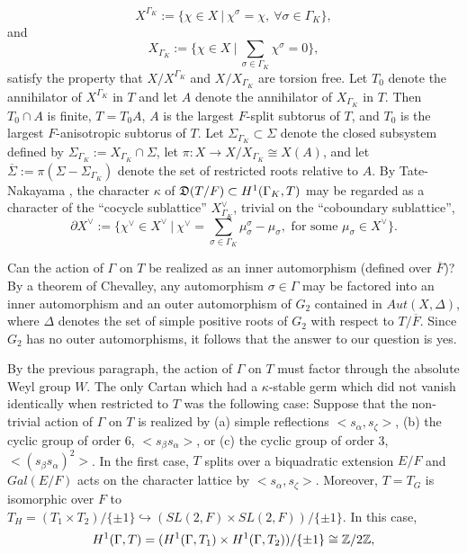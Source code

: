 $$
X^{\Gamma_K}:=\{\chi\in X\ |\ \chi^\sigma =\chi,\ \forall\sigma\in\Gamma_K\},
$$
and
$$
X_{\Gamma_K}:=\{\chi\in X\ |\ \sum_{\sigma\in\Gamma_K}\chi^\sigma =0\},
$$
satisfy the property that $X/X^{\Gamma_K}$ and $X/X_{\Gamma_K}$ are
torsion free. Let $T_0$ denote the annihilator of
$X^{\Gamma_K}$ in $T$ and let $A$ denote the annihilator of 
$X_{\Gamma_K}$ in $T$.
Then $T_0\cap A$ is finite, $T=T_0A$, $A$ is the largest $F$-split
subtorus of $T$, and $T_0$ is the largest $F$-anisotropic subtorus of $T$. 
Let $\Sigma_{\Gamma_K}\subset \Sigma$ denote the closed
subsystem defined by $\Sigma_{\Gamma_K}:=X_{\Gamma_K}\cap \Sigma$, let
$\pi:X\rightarrow X/X_{\Gamma_K} \cong X(A)$, and let $\overline{\Sigma}:=
\pi( \Sigma-\Sigma_{\Gamma_K})$ denote the set of restricted roots 
relative to $A$. By Tate-Nakayama \cite{L', p. 702},
the character $\kappa$ of ${\frak D}(T/F)\subset H^1(\Gamma_K,T)$
may be regarded as a character of the ``cocycle sublattice'' 
$X_{\Gamma_K}^{\vee}$, trivial on the ``coboundary sublattice'',
$$
\partial X^{\vee}:=\{\chi^{\vee}\in X^{\vee}\ |\ 
\chi^{\vee}=\sum_{\sigma\in\Gamma_K}\mu_\sigma^\sigma-\mu_\sigma,
\text{ for some }\mu_\sigma\in X^{\vee}\}.
$$
\par
Can the action of $\Gamma$ on $T$ be realized as
an inner automorphism (defined over $\overline{F}$)? By a theorem of
Chevalley, any automorphism
$\sigma\in\Gamma$ may be factored into an inner automorphism and 
an outer automorphism of $G_2$ contained in
$Aut(X,\Delta)$, where $\Delta$ denotes the set of simple positive
roots of $G_2$ with respect to $T/\overline{F}$. Since $G_2$ has no outer
automorphisms, it follows that the answer to our question is yes.
\par
By the previous paragraph, the action of $\Gamma$ on $T$ must factor
through the absolute Weyl group $W$. The only Cartan which had
a $\kappa$-stable germ which did not vanish identically when restricted
to $T$ was the following case:
\newline
Suppose that the non-trivial action of $\Gamma$ on $T$ is realized
by (a) simple reflections $<s_\alpha,s_\zeta>$, (b) the cyclic group
of order $6$, $<s_\beta s_\alpha>$, or (c) the cyclic group
of order $3$, $<(s_\beta s_\alpha)^2>$. 
In the first case, $T$ splits over a
biquadratic extension $E/F$ and $Gal(E/F)$ acts on the character lattice 
by $<s_\alpha,s_\zeta>$. Moreover, $T=T_G$ is isomorphic over $F$
to $T_H=(T_1\times T_2)/\{\pm 1\}
\hookrightarrow (SL(2,F)\times SL(2,F))/\{\pm 1\}$.
In this case, 
$$
H^1(\Gamma,T)=(H^1(\Gamma,T_1)\times H^1(\Gamma,T_2))/\{\pm 1\}
\cong {\Bbb Z}/2{\Bbb Z},
$$

